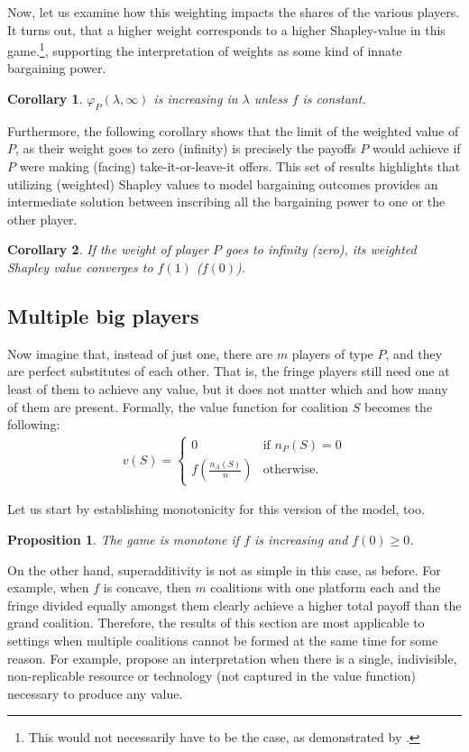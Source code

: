 \documentclass[a4paper]{article}
\newtheorem{proposition}{Proposition}
\newtheorem{corollary}{Corollary}
\begin{document}
Now, let us examine how this weighting impacts the shares of the various players.
It turns out, that a higher weight corresponds to a higher Shapley-value in this game.\footnote{
    This would not necessarily have to be the case, as demonstrated by \textcite{owen1968communications}.
},
supporting the interpretation of weights as some kind of innate bargaining power.
\begin{corollary}
    \label{cor:platform_value_weighted}
    $\varphi_P(\lambda, \infty)$ is increasing in $\lambda$ unless $f$ is constant.
\end{corollary}

Furthermore, the following corollary shows that the limit of the weighted value of $P$, as their weight goes to zero (infinity) is precisely the payoffs $P$ would achieve if $P$ were making (facing) take-it-or-leave-it offers.
This set of results highlights that utilizing (weighted) Shapley values to model bargaining outcomes provides an intermediate solution between inscribing all the bargaining power to one or the other player.
\begin{corollary}
    \label{cor:paltform_value_weighted_2}
    If the weight of player $P$ goes to infinity (zero), its weighted Shapley value converges to $f(1)$ ($f(0)$).
\end{corollary}

\subsection{Multiple big players}

Now imagine that, instead of just one, there are $m$ players of type $P$, and they are perfect substitutes of each other.
That is, the fringe players still need one at least of them to achieve any value, but it does not matter which and how many of them are present.
Formally, the value function for coalition $S$ becomes the following:
\begin{align*}
    v(S) = \begin{cases}
        0                              & \text{if } n_P(S) = 0 \\
        f\left(\frac{n_A(S)}{n}\right) & \text{otherwise}.
    \end{cases}
\end{align*}

Let us start by establishing monotonicity for this version of the model, too.
\begin{proposition}
    The game is monotone if $f$ is increasing and $f(0) \geq 0$.
\end{proposition}
On the other hand, superadditivity is not as simple in this case, as before.
For example, when $f$ is concave, then $m$ coalitions with one platform each and the fringe divided equally amongst them clearly achieve a higher total payoff than the grand coalition.
Therefore, the results of this section are most applicable to settings when multiple coalitions cannot be formed at the same time for some reason.
For example, \textcite{hart1996bargaining} propose an interpretation when there is a single, indivisible, non-replicable resource or technology (not captured in the value function) necessary to produce any value.
\end{document}
